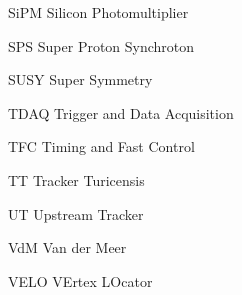 \begin{abbreviations}
    \item[SiPM] Silicon Photomultiplier
    \item[SPS] Super Proton Synchroton
    \item[SUSY] Super Symmetry
    \item[TDAQ] Trigger and Data Acquisition
    \item[TFC] Timing and Fast Control
    \item[TT] Tracker Turicensis
    \item[UT] Upstream Tracker
    \item[VdM] Van der Meer
    \item[VELO] VErtex LOcator
\end{abbreviations}

